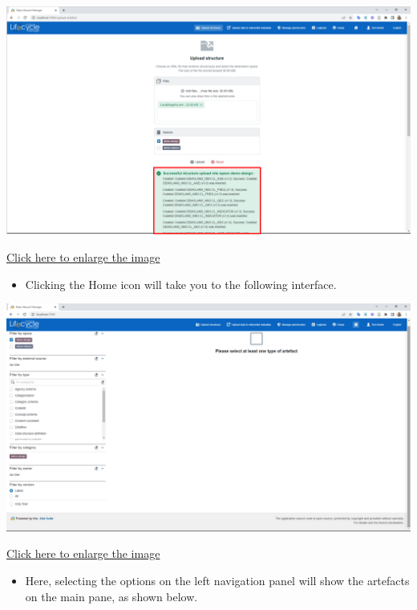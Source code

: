 \documentclass[
]{book}
\providecommand{\tightlist}{%
  \setlength{\itemsep}{0pt}\setlength{\parskip}{0pt}}
\begin{document}
\begin{center}\includegraphics[width=1\linewidth]{./images/image202} \end{center}

\href{images/image202.png}{Click here to enlarge the image}

\begin{itemize}
\tightlist
\item
  Clicking the Home icon will take you to the following interface.
\end{itemize}

\begin{center}\includegraphics[width=1\linewidth]{./images/image204} \end{center}

\href{images/image204.png}{Click here to enlarge the image}

\begin{itemize}
\tightlist
\item
  Here, selecting the options on the left navigation panel will show the artefacts on the main pane, as shown below.
\end{itemize}
\end{document}
